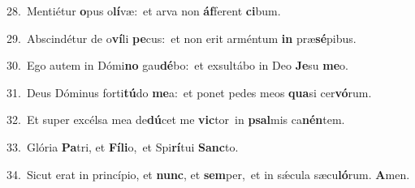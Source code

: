 {\numbfont\textcolor{\numbcolor}{28.}}~Mentiétur \textbf{o}\-pus o\-\textbf{lí}\-væ:~\star et arva non \textbf{áf}\-ferent \textbf{ci}\-bum.\par
{\numbfont\textcolor{\numbcolor}{29.}}~Abscindétur de o\-\textbf{ví}\-li \textbf{pe}\-cus:~\star et non erit arméntum \textbf{in} præ\-\textbf{sé}\-pibus.\par
{\numbfont\textcolor{\numbcolor}{30.}}~Ego autem in Dómi\textbf{no} gau\-\textbf{dé}\-bo:~\star et exsultábo in Deo \textbf{Je}\-su \textbf{me}\-o.\par
{\numbfont\textcolor{\numbcolor}{31.}}~Deus Dóminus forti\-\textbf{tú}\-do \textbf{me}\-a:~\star et ponet pedes meos \textbf{qua}\-si cer\-\textbf{vó}\-rum.\par
{\numbfont\textcolor{\numbcolor}{32.}}~Et super excélsa mea de\-\textbf{dú}\-cet me \textbf{vic}\-tor~\star in \textbf{psal}\-mis ca\-\textbf{nén}\-tem.\par
{\numbfont\textcolor{\numbcolor}{33.}}~Glória \textbf{Pa}\-tri, et \textbf{Fí}\-\textbf{li}o,~\star et Spi\-\textbf{rí}\-tui \textbf{Sanc}\-to.\par
{\numbfont\textcolor{\numbcolor}{34.}}~Sicut erat in princípio, et \textbf{nunc}\-, et \textbf{sem}\-per,~\star et in sǽcula sæcu\-\textbf{ló}\-rum. \textbf{A}\-men.\par
